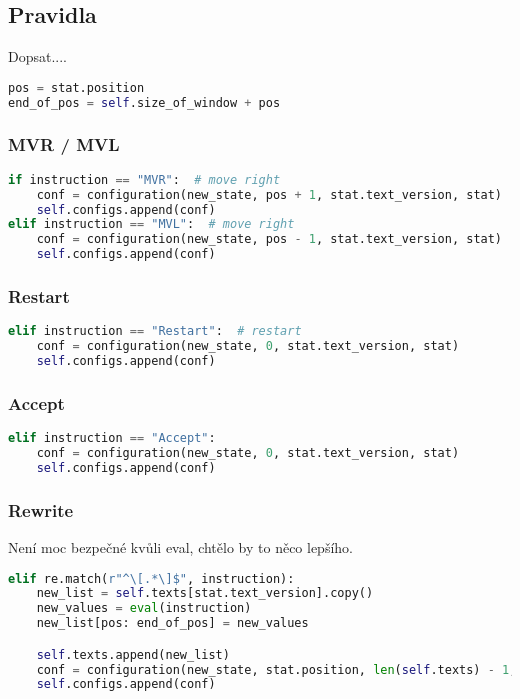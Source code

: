 \documentclass{article}
\begin{document}
\subsection{Pravidla}
Dopsat....
\begin{lstlisting}[language=Python]
pos = stat.position
end_of_pos = self.size_of_window + pos
\end{lstlisting}

\subsubsection{MVR / MVL}
\begin{lstlisting}[language=Python]
if instruction == "MVR":  # move right
	conf = configuration(new_state, pos + 1, stat.text_version, stat)
	self.configs.append(conf)
elif instruction == "MVL":  # move right
	conf = configuration(new_state, pos - 1, stat.text_version, stat)
	self.configs.append(conf)
\end{lstlisting}


\subsubsection{Restart}
\begin{lstlisting}[language=Python]
elif instruction == "Restart":  # restart
	conf = configuration(new_state, 0, stat.text_version, stat)
	self.configs.append(conf)
\end{lstlisting}


\subsubsection{Accept}
\begin{lstlisting}[language=Python]
elif instruction == "Accept":
	conf = configuration(new_state, 0, stat.text_version, stat)
	self.configs.append(conf)
\end{lstlisting}


\subsubsection{Rewrite}
Není moc bezpečné kvůli eval, chtělo by to něco lepšího.
\begin{lstlisting}[language=Python]
	elif re.match(r"^\[.*\]$", instruction):
	new_list = self.texts[stat.text_version].copy()
	new_values = eval(instruction)
	new_list[pos: end_of_pos] = new_values

	self.texts.append(new_list)
	conf = configuration(new_state, stat.position, len(self.texts) - 1, stat)
	self.configs.append(conf)
\end{lstlisting}
\end{document}
